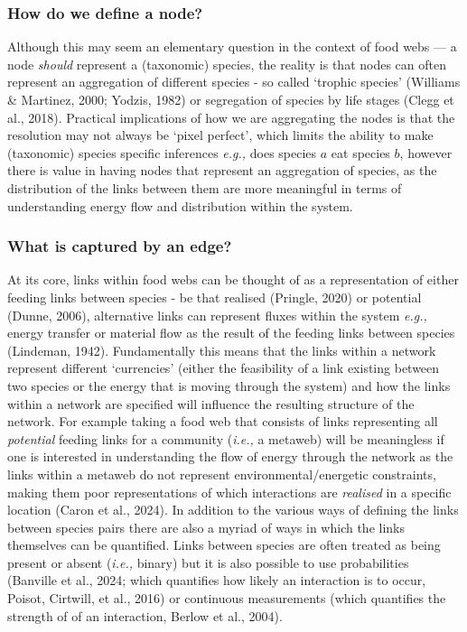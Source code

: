 \documentclass[
]{article}
\begin{document}
\subsubsection{How do we define a node?}\label{how-do-we-define-a-node}

Although this may seem an elementary question in the context of food
webs --- a node \emph{should} represent a (taxonomic) species, the
reality is that nodes can often represent an aggregation of different
species - so called `trophic species' (Williams \& Martinez, 2000;
Yodzis, 1982) or segregation of species by life stages (Clegg et al.,
2018). Practical implications of how we are aggregating the nodes is
that the resolution may not always be `pixel perfect', which limits the
ability to make (taxonomic) species specific inferences \emph{e.g.,}
does species \(a\) eat species \(b\), however there is value in having
nodes that represent an aggregation of species, as the distribution of
the links between them are more meaningful in terms of understanding
energy flow and distribution within the system.

\subsubsection{What is captured by an
edge?}\label{what-is-captured-by-an-edge}

At its core, links within food webs can be thought of as a
representation of either feeding links between species - be that
realised (Pringle, 2020) or potential (Dunne, 2006), alternative links
can represent fluxes within the system \emph{e.g.,} energy transfer or
material flow as the result of the feeding links between species
(Lindeman, 1942). Fundamentally this means that the links within a
network represent different `currencies' (either the feasibility of a
link existing between two species or the energy that is moving through
the system) and how the links within a network are specified will
influence the resulting structure of the network. For example taking a
food web that consists of links representing all \emph{potential}
feeding links for a community (\emph{i.e.,} a metaweb) will be
meaningless if one is interested in understanding the flow of energy
through the network as the links within a metaweb do not represent
environmental/energetic constraints, making them poor representations of
which interactions are \emph{realised} in a specific location (Caron et
al., 2024). In addition to the various ways of defining the links
between species pairs there are also a myriad of ways in which the links
themselves can be quantified. Links between species are often treated as
being present or absent (\emph{i.e.,} binary) but it is also possible to
use probabilities (Banville et al., 2024; which quantifies how likely an
interaction is to occur, Poisot, Cirtwill, et al., 2016) or continuous
measurements (which quantifies the strength of of an interaction, Berlow
et al., 2004).
\end{document}
